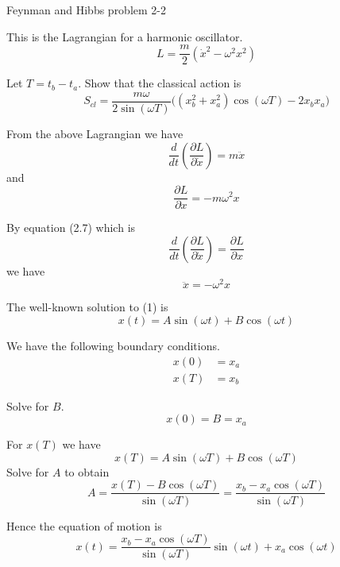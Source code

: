 \documentclass[12pt]{article}
\begin{document}
Feynman and Hibbs problem 2-2

\bigskip
This is the Lagrangian for a harmonic oscillator.
\begin{equation*}
L=\frac{m}{2}(\dot{x}^2-\omega^2 x^2)
\end{equation*}

\noindent
Let $T=t_b-t_a$.
Show that the classical action is
\begin{equation*}
S_{cl}=\frac{m\omega}{2\sin(\omega T)}
\bigg((x_b^2+x_a^2)\cos(\omega T)-2x_b x_a\bigg)
\end{equation*}

From the above Lagrangian we have
\begin{equation*}
\frac{d}{dt}\left(\frac{\partial L}{\partial\dot x}\right)=m\ddot x
\end{equation*}
and
\begin{equation*}
\frac{\partial L}{\partial x}=-m\omega^2x
\end{equation*}

By equation (2.7) which is
\begin{equation*}
\frac{d}{dt}\left(\frac{\partial L}{\partial\dot x}\right)=\frac{\partial L}{\partial x}
\end{equation*}
we have
\begin{equation*}
\ddot x=-\omega^2x
\tag{1}
\end{equation*}

The well-known solution to (1) is
\begin{equation*}
x(t)=A\sin(\omega t)+B\cos(\omega t)
\end{equation*}

We have the following boundary conditions.
\begin{align*}
x(0)&=x_a
\\
x(T)&=x_b
\end{align*}

Solve for $B$.
\begin{equation*}
x(0)=B=x_a
\end{equation*}

For $x(T)$ we have
\begin{equation*}
x(T)=A\sin(\omega T)+B\cos(\omega T)
\end{equation*}
Solve for $A$ to obtain
\begin{equation*}
A=\frac{x(T)-B\cos(\omega T)}{\sin(\omega T)}=
\frac{x_b-x_a\cos(\omega T)}{\sin(\omega T)}
\end{equation*}

Hence the equation of motion is
\begin{equation*}
x(t)=\frac{x_b-x_a\cos(\omega T)}{\sin(\omega T)} \sin(\omega t)+x_a\cos(\omega t)
\end{equation*}
\end{document}
